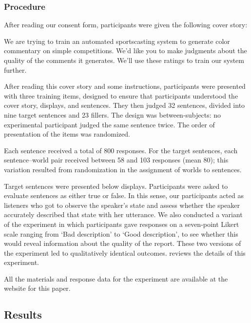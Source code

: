 \documentclass[leqno,12pt]{article}
\begin{document}
\subsubsection{Procedure} 

After reading our consent form, participants were given the following
cover story:
%
\begin{examples}
\item\label{coverstory}
  We are trying to train an automated sportscasting system to generate
  color commentary on simple competitions. We'd like you to make
  judgments about the quality of the comments it generates. We'll use
  these ratings to train our system further.
\end{examples}

After reading this cover story and some instructions, participants
were presented with three training items, designed to ensure that
participants understood the cover story, displays, and sentences. They
then judged 32 sentences, divided into nine target sentences and 23
fillers. The design was between-subjects: no experimental participant
judged the same sentence twice. The order of presentation of the items
was randomized.
 
Each sentence received a total of 800 responses. For the target
sentences, each sentence--world pair received between 58 and 103
responses (mean 80); this variation resulted from randomization in the
assignment of worlds to sentences.

Target sentences were presented below displays. Participants were
asked to evaluate sentences as either true or false. In this sense,
our participants acted as listeners who got to observe the speaker's
state and assess whether the speaker accurately described that state
with her utterance. We also conducted a variant of the experiment in
which participants gave responses on a seven-point Likert scale
ranging from `Bad description' to `Good description', to see whether
this would reveal information about the quality of the report. These
two versions of the experiment led to qualitatively identical
outcomes.  reviews the details of this
experiment.

All the materials and response data for the experiment are available
at the website for this paper.


\subsection{Results}\label{sec:binary:results}
\end{document}
